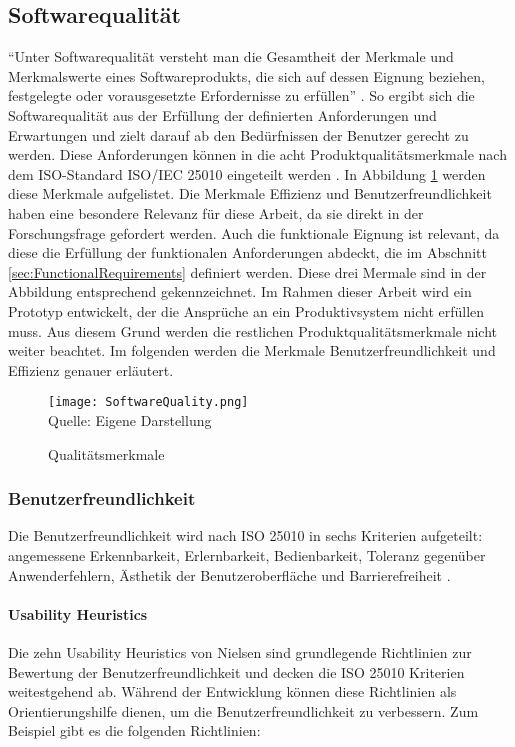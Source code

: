 \subsection{Softwarequalität}
``Unter Softwarequalität versteht man die Gesamtheit der Merkmale und Merkmalswerte eines Softwareprodukts, die sich auf dessen Eignung beziehen, festgelegte oder vorausgesetzte Erfordernisse zu erfüllen'' \cite[S.~257]{Balzert1998}. So ergibt sich die Softwarequalität aus der Erfüllung der definierten Anforderungen und Erwartungen und zielt darauf ab den Bedürfnissen der Benutzer gerecht zu werden. Diese Anforderungen können in die acht Produktqualitätsmerkmale nach dem ISO-Standard ISO/IEC 25010 eingeteilt werden \cite{ISO25010}. In Abbildung \ref{fig:SoftwareQuality} werden diese Merkmale aufgelistet. Die Merkmale Effizienz und Benutzerfreundlichkeit haben eine besondere Relevanz für diese Arbeit, da sie direkt in der Forschungsfrage gefordert werden. Auch die funktionale Eignung ist relevant, da diese die Erfüllung der funktionalen Anforderungen abdeckt, die im Abschnitt \ref{sec:FunctionalRequirements} definiert werden. Diese drei Mermale sind in der Abbildung entsprechend gekennzeichnet. Im Rahmen dieser Arbeit wird ein Prototyp entwickelt, der die Ansprüche an ein Produktivsystem nicht erfüllen muss. Aus diesem Grund werden die restlichen Produktqualitätsmerkmale nicht weiter beachtet. Im folgenden werden die Merkmale Benutzerfreundlichkeit und Effizienz genauer erläutert.

\begin{figure}[H]
    \caption{Qualitätsmerkmale}\label{fig:SoftwareQuality}
    \texttt{[image: SoftwareQuality.png]}
    \\
    Quelle: Eigene Darstellung
\end{figure}

\subsubsection{Benutzerfreundlichkeit}
Die Benutzerfreundlichkeit wird nach ISO 25010 in sechs Kriterien aufgeteilt: angemessene Erkennbarkeit, Erlernbarkeit, Bedienbarkeit, Toleranz gegenüber Anwenderfehlern, Ästhetik der Benutzeroberfläche und Barrierefreiheit \cite{ISO25010}.

\paragraph{Usability Heuristics}
Die zehn Usability Heuristics von Nielsen sind grundlegende Richtlinien zur Bewertung der Benutzerfreundlichkeit \cite{Nielsen.1994} und decken die ISO 25010 Kriterien weitestgehend ab. Während der Entwicklung können diese Richtlinien als Orientierungshilfe dienen, um die Benutzerfreundlichkeit zu verbessern. Zum Beispiel gibt es die folgenden Richtlinien:

